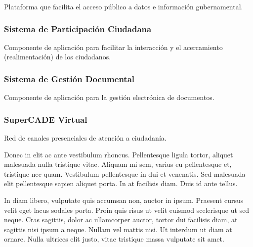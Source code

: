 \documentclass[
	a4paper, %
	12pt, %
]{include/CSSullivanBusinessReport}
\begin{document}
Plataforma que facilita el acceso público a datos e información
gubernamental.

\subsubsection{Sistema de Participación
Ciudadana}\label{sec:sistema-de-participaciuxf3n-ciudadana}

Componente de aplicación para facilitar la interacción y el acercamiento
(realimentación) de los ciudadanos.

\subsubsection{Sistema de Gestión
Documental}\label{sec:sistema-de-gestiuxf3n-documental}

Componente de aplicación para la gestión electrónica de documentos.

\subsubsection{SuperCADE Virtual}\label{sec:supercade-virtual}

Red de canales presenciales de atención a
ciudadanía.

Donec in elit ac ante vestibulum rhoncus. Pellentesque ligula tortor, aliquet malesuada nulla tristique vitae. Aliquam mi sem, varius eu pellentesque et, tristique nec quam. Vestibulum pellentesque in dui et venenatis. Sed malesuada elit pellentesque sapien aliquet porta. In at facilisis diam. Duis id ante tellus. %

In diam libero, vulputate quis accumsan non, auctor in ipsum. Praesent cursus velit eget lacus sodales porta. Proin quis risus ut velit euismod scelerisque ut sed neque. Cras sagittis, dolor ac ullamcorper auctor, tortor dui facilisis diam, at sagittis nisi ipsum a neque. Nullam vel mattis nisi. Ut interdum ut diam at ornare. Nulla ultrices elit justo, vitae tristique massa vulputate sit amet.
\end{document}
